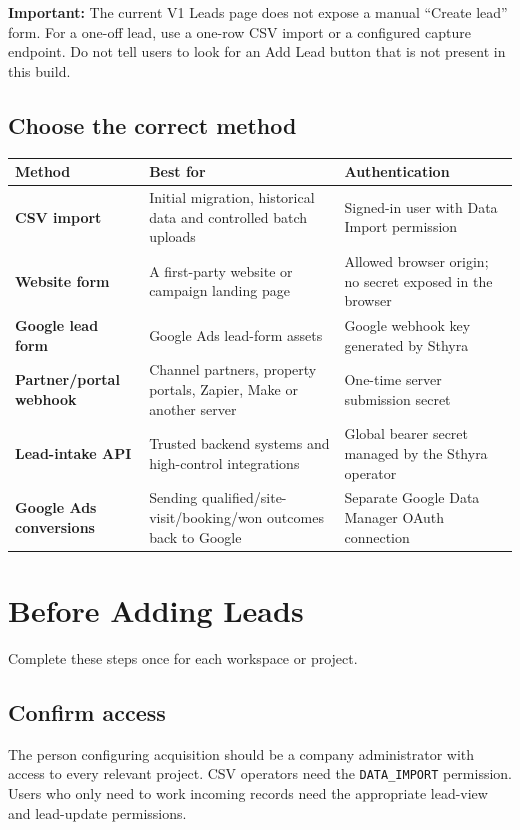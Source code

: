 \documentclass[11pt,a4paper]{article}
\newcommand{\code}[1]{\texttt{#1}}
\newcommand{\warningbox}[1]{%
  \vspace{4pt}%
  \noindent\colorbox{WarningBg}{%
    \parbox{\dimexpr\linewidth-2\fboxsep\relax}{\textbf{Important:} #1}%
  }%
  \vspace{4pt}%
}
\begin{document}
\warningbox{The current V1 Leads page does not expose a manual ``Create lead'' form. For a one-off lead, use a one-row CSV import or a configured capture endpoint. Do not tell users to look for an Add Lead button that is not present in this build.}

\subsection{Choose the correct method}

\begin{tabularx}{\textwidth}{@{}>{\bfseries}p{31mm}X X@{}}
\toprule
Method & Best for & Authentication \\
\midrule
CSV import & Initial migration, historical data and controlled batch uploads & Signed-in user with Data Import permission \\
Website form & A first-party website or campaign landing page & Allowed browser origin; no secret exposed in the browser \\
Google lead form & Google Ads lead-form assets & Google webhook key generated by Sthyra \\
Partner/portal webhook & Channel partners, property portals, Zapier, Make or another server & One-time server submission secret \\
Lead-intake API & Trusted backend systems and high-control integrations & Global bearer secret managed by the Sthyra operator \\
Google Ads conversions & Sending qualified/site-visit/booking/won outcomes back to Google & Separate Google Data Manager OAuth connection \\
\bottomrule
\end{tabularx}

\section{Before Adding Leads}

Complete these steps once for each workspace or project.

\subsection{Confirm access}

The person configuring acquisition should be a company administrator with access to every relevant project. CSV operators need the \code{DATA\_IMPORT} permission. Users who only need to work incoming records need the appropriate lead-view and lead-update permissions.
\end{document}

